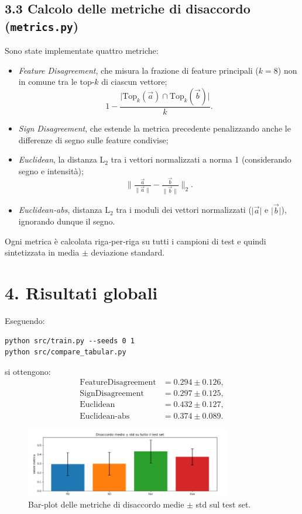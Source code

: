 \documentclass[a4paper,11pt]{article}
\begin{document}
\subsection*{3.3 Calcolo delle metriche di disaccordo (\texttt{metrics.py})}
Sono state implementate quattro metriche:
\begin{itemize}
  \item \emph{Feature Disagreement}, che misura la frazione di feature principali (\(k=8\)) non in comune tra le top-\(k\) di ciascun vettore;
  \[
  1 - \frac{\lvert\mathrm{Top}_k(\vec a)\cap \mathrm{Top}_k(\vec b)\rvert}{k}.
  \]
  \item \emph{Sign Disagreement}, che estende la metrica precedente penalizzando anche le differenze di segno sulle feature condivise;
  \item \emph{Euclidean}, la distanza L\(_2\) tra i vettori normalizzati a norma 1 (considerando segno e intensità);
  \[
  \|\tfrac{\vec a}{\|\vec a\|}-\tfrac{\vec b}{\|\vec b\|}\|_2.
  \]
  \item \emph{Euclidean‐abs}, distanza L\(_2\) tra i moduli dei vettori normalizzati (\(\lvert\vec a\rvert\) e \(\lvert\vec b\rvert\)), ignorando dunque il segno.
\end{itemize}
Ogni metrica è calcolata riga‐per‐riga su tutti i campioni di test e quindi sintetizzata in media \(\pm\) deviazione standard.

\section*{4. Risultati globali}
Eseguendo:
\begin{verbatim}
python src/train.py --seeds 0 1
python src/compare_tabular.py
\end{verbatim}
si ottengono: 
\[
\begin{aligned}
\text{FeatureDisagreement} &= 0.294 \pm 0.126,\\
\text{SignDisagreement}    &= 0.297 \pm 0.125,\\
\text{Euclidean}           &= 0.432 \pm 0.127,\\
\text{Euclidean-abs}       &= 0.374 \pm 0.089.
\end{aligned}
\]

\begin{figure}[htbp]
  \centering
  \includegraphics[width=0.8\textwidth]{globali.png}
  \caption{Bar-plot delle metriche di disaccordo medie $\pm$ std sul test set.}
  \label{fig:global_vs_case}
\end{figure}
\end{document}
